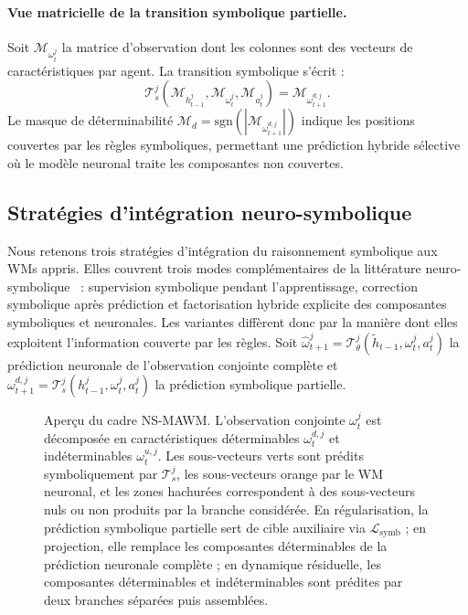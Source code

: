 \documentclass[final]{jfsma}
\theoremstyle{plain}
\theoremstyle{definition}
\theoremstyle{remark}
\begin{document}
\paragraph{Vue matricielle de la transition symbolique partielle.} Soit $\mathcal{M}_{\omega^j_t}$ la matrice d'observation dont les colonnes sont des vecteurs de caractéristiques par agent. La transition symbolique s'écrit :
%
\begin{equation}
  \label{eq:symbolic-transition}
  \mathcal{T}^j_s\!\left(
  \mathcal{M}_{h^j_{t-1}},
  \mathcal{M}_{\omega^j_t},
  \mathcal{M}_{a^j_t}
  \right)
  = \mathcal{M}_{\omega^{d,j}_{t+1}}.
\end{equation}
%
Le masque de déterminabilité $\mathcal{M}_d = \mathrm{sgn}\!\left(\left| \mathcal{M}_{\omega^{d,j}_{t+1}} \right| \right)$ indique les positions couvertes par les règles symboliques, permettant une prédiction hybride sélective où le modèle neuronal traite les composantes non couvertes.

\subsection{Stratégies d'intégration neuro-symbolique}
\label{sec:strategies}

Nous retenons trois stratégies d'intégration du raisonnement symbolique aux WMs appris. Elles couvrent trois modes complémentaires de la littérature neuro-symbolique~\cite{Xu2018semanticloss,Fan2017differentiablelearninglogicalrules,garcez2023neurosymbolic} : supervision symbolique pendant l'apprentissage, correction symbolique après prédiction et factorisation hybride explicite des composantes symboliques et neuronales. Les variantes diffèrent donc par la manière dont elles exploitent l'information couverte par les règles.
Soit $\hat{\omega}^j_{t+1} = \mathcal{T}_{\theta}^j(\tilde{h}_{t-1}, \omega^j_t, a^j_t)$ la prédiction neuronale de l'observation conjointe complète et $\omega^{d,j}_{t+1} = \mathcal{T}^j_s(h^j_{t-1}, \omega^j_t, a^j_t)$ la prédiction symbolique partielle.

\begin{figure}[htb]
  \centering
  
  \caption{Aperçu du cadre NS-MAWM. L'observation conjointe $\omega^j_t$ est décomposée en caractéristiques déterminables $\omega^{d,j}_t$ et indéterminables $\omega^{u,j}_t$. Les sous-vecteurs verts sont prédits symboliquement par $\mathcal{T}^j_s$, les sous-vecteurs orange par le WM neuronal, et les zones hachurées correspondent à des sous-vecteurs nuls ou non produits par la branche considérée. En régularisation, la prédiction symbolique partielle sert de cible auxiliaire via $\mathcal{L}_{\mathrm{symb}}$ ; en projection, elle remplace les composantes déterminables de la prédiction neuronale complète ; en dynamique résiduelle, les composantes déterminables et indéterminables sont prédites par deux branches séparées puis assemblées.}
  \label{fig:ns-mawm_overview}
\end{figure}
\end{document}
